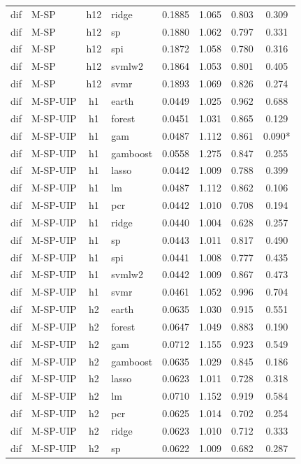 \begin{ThreePartTable}
\begin{longtable}[t]{llclcccc}
dif & M-SP & h12 & ridge & 0.1885 & 1.065 & 0.803 & 0.309\\
dif & M-SP & h12 & sp & 0.1880 & 1.062 & 0.797 & 0.331\\
dif & M-SP & h12 & spi & 0.1872 & 1.058 & 0.780 & 0.316\\
dif & M-SP & h12 & svmlw2 & 0.1864 & 1.053 & 0.801 & 0.405\\
dif & M-SP & h12 & svmr & 0.1893 & 1.069 & 0.826 & 0.274\\
\addlinespace
dif & M-SP-UIP & h1 & earth & 0.0449 & 1.025 & 0.962 & 0.688\\
dif & M-SP-UIP & h1 & forest & 0.0451 & 1.031 & 0.865 & 0.129\\
dif & M-SP-UIP & h1 & gam & 0.0487 & 1.112 & 0.861 & 0.090*\\
dif & M-SP-UIP & h1 & gamboost & 0.0558 & 1.275 & 0.847 & 0.255\\
dif & M-SP-UIP & h1 & lasso & 0.0442 & 1.009 & 0.788 & 0.399\\
dif & M-SP-UIP & h1 & lm & 0.0487 & 1.112 & 0.862 & 0.106\\
dif & M-SP-UIP & h1 & pcr & 0.0442 & 1.010 & 0.708 & 0.194\\
dif & M-SP-UIP & h1 & ridge & 0.0440 & 1.004 & 0.628 & 0.257\\
dif & M-SP-UIP & h1 & sp & 0.0443 & 1.011 & 0.817 & 0.490\\
dif & M-SP-UIP & h1 & spi & 0.0441 & 1.008 & 0.777 & 0.435\\
dif & M-SP-UIP & h1 & svmlw2 & 0.0442 & 1.009 & 0.867 & 0.473\\
dif & M-SP-UIP & h1 & svmr & 0.0461 & 1.052 & 0.996 & 0.704\\
\addlinespace
dif & M-SP-UIP & h2 & earth & 0.0635 & 1.030 & 0.915 & 0.551\\
dif & M-SP-UIP & h2 & forest & 0.0647 & 1.049 & 0.883 & 0.190\\
dif & M-SP-UIP & h2 & gam & 0.0712 & 1.155 & 0.923 & 0.549\\
dif & M-SP-UIP & h2 & gamboost & 0.0635 & 1.029 & 0.845 & 0.186\\
dif & M-SP-UIP & h2 & lasso & 0.0623 & 1.011 & 0.728 & 0.318\\
dif & M-SP-UIP & h2 & lm & 0.0710 & 1.152 & 0.919 & 0.584\\
dif & M-SP-UIP & h2 & pcr & 0.0625 & 1.014 & 0.702 & 0.254\\
dif & M-SP-UIP & h2 & ridge & 0.0623 & 1.010 & 0.712 & 0.333\\
dif & M-SP-UIP & h2 & sp & 0.0622 & 1.009 & 0.682 & 0.287\\

\end{longtable}
\end{ThreePartTable}
